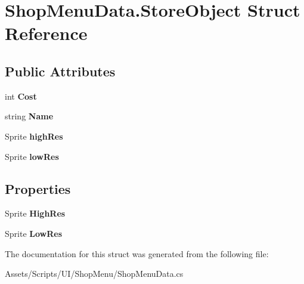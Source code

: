 \hypertarget{struct_shop_menu_data_1_1_store_object}{}\section{Shop\+Menu\+Data.\+Store\+Object Struct Reference}
\label{struct_shop_menu_data_1_1_store_object}
\subsection*{Public Attributes}
\begin{DoxyCompactItemize}
\item 
int {\bfseries Cost}\hypertarget{struct_shop_menu_data_1_1_store_object_ac797283146eda8c6f5caac923ce91e0a}{}\label{struct_shop_menu_data_1_1_store_object_ac797283146eda8c6f5caac923ce91e0a}

\item 
string {\bfseries Name}\hypertarget{struct_shop_menu_data_1_1_store_object_abcdac11e4ad08771addee94bf3e0beec}{}\label{struct_shop_menu_data_1_1_store_object_abcdac11e4ad08771addee94bf3e0beec}

\item 
Sprite {\bfseries high\+Res}\hypertarget{struct_shop_menu_data_1_1_store_object_aadb875fad54944b3520549ed93dbc299}{}\label{struct_shop_menu_data_1_1_store_object_aadb875fad54944b3520549ed93dbc299}

\item 
Sprite {\bfseries low\+Res}\hypertarget{struct_shop_menu_data_1_1_store_object_a780bd7114526f0f2b9b2ca2c16180b70}{}\label{struct_shop_menu_data_1_1_store_object_a780bd7114526f0f2b9b2ca2c16180b70}

\end{DoxyCompactItemize}
\subsection*{Properties}
\begin{DoxyCompactItemize}
\item 
Sprite {\bfseries High\+Res}\hypertarget{struct_shop_menu_data_1_1_store_object_a49483829662a084893fbce00ae51bff0}{}\label{struct_shop_menu_data_1_1_store_object_a49483829662a084893fbce00ae51bff0}

\item 
Sprite {\bfseries Low\+Res}\hypertarget{struct_shop_menu_data_1_1_store_object_ab45dd78670346b34ded73bf2d205e3d9}{}\label{struct_shop_menu_data_1_1_store_object_ab45dd78670346b34ded73bf2d205e3d9}

\end{DoxyCompactItemize}


The documentation for this struct was generated from the following file\+:\begin{DoxyCompactItemize}
\item 
Assets/\+Scripts/\+U\+I/\+Shop\+Menu/Shop\+Menu\+Data.\+cs\end{DoxyCompactItemize}
